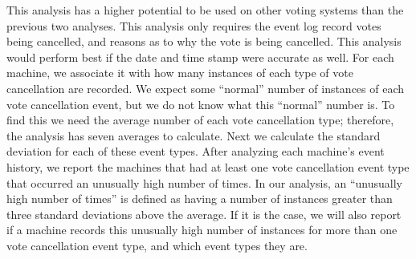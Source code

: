 This analysis has a higher potential to be used on other voting systems than the previous two analyses.  This analysis only requires the event log record votes being cancelled, and reasons as to why the vote is being cancelled.  This analysis would perform best if the date and time stamp were accurate as well.  For each machine, we associate it with how many instances of each type of vote cancellation are recorded.  We expect some \textquotedblleft normal\textquotedblright \hspace{1 mm} number of instances of each vote cancellation event, but we do not know what this \textquotedblleft normal\textquotedblright \hspace{1 mm} number is.  To find this we need the average number of each vote cancellation type; therefore, the analysis has seven averages to calculate.  Next we calculate the standard deviation for each of these event types.  After analyzing each machine’s event history, we report the machines that had at least one vote cancellation event type that occurred an unusually high number of times. In our analysis, an \textquotedblleft unusually high number of times\textquotedblright \hspace{1 mm} is defined as having a number of instances greater than three standard deviations above the average.  If it is the case, we will also report if a machine records this unusually high number of instances for more than one vote cancellation event type, and which event types they are.  

